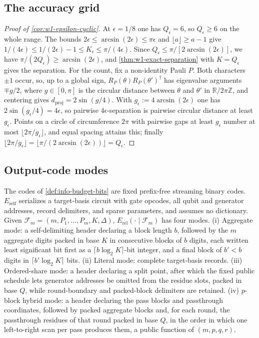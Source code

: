 \subsection{The accuracy grid}

\begin{proof}[Proof of \cref{cor:w1-epsilon-cyclic}]
At $\epsilon=1/8$ one has $Q_\epsilon=6$, so $Q_\epsilon\geq6$ on the
whole range.  The bounds $2\epsilon\leq\arcsin(2\epsilon)\leq\pi\epsilon$
and $\lfloor a\rfloor\geq a-1$ give
$1/(4\epsilon)\leq1/(2\epsilon)-1\leq K_\epsilon\leq\pi/(4\epsilon)$.
Since $Q_\epsilon\leq\pi/[2\arcsin(2\epsilon)]$, we have
$\pi/(2Q_\epsilon)\geq\arcsin(2\epsilon)$, and
\cref{thm:w1-exact-separation} with $K=Q_\epsilon$ gives the separation.
For the count, fix a non-identity Pauli $P$.  Both characters $\pm1$ occur,
so, up to a global sign, $R_P(\theta)R_P(\theta')^\dagger$ has eigenvalue
arguments $\mp g/2$, where $g\in[0,\pi]$ is the circular distance between
$\theta$ and $\theta'$ in $\mathbb R/2\pi\mathbb Z$, and centering gives $d_{\mathrm{proj}}=2\sin(g/4)$.  With
$g_\epsilon:=4\arcsin(2\epsilon)$ one has $2\sin(g_\epsilon/4)=4\epsilon$,
so pairwise $4\epsilon$-separation is pairwise circular distance at least
$g_\epsilon$.  Points on a circle of circumference $2\pi$ with pairwise
gaps at least $g_\epsilon$ number at most $\lfloor2\pi/g_\epsilon\rfloor$,
and equal spacing attains this; finally
$\lfloor2\pi/g_\epsilon\rfloor=\lfloor\pi/(2\arcsin(2\epsilon))\rfloor
=Q_\epsilon$.
\end{proof}

\subsection{Output-code modes}

The codes of \cref{def:info-budget-bits} are fixed prefix-free streaming
binary codes.  $E_{\mathrm{self}}$ serializes a target-basis circuit with
gate opcodes, all qubit and generator addresses, record delimiters, and
sparse parameters, and assumes no dictionary.  Given
$\mathcal F_m=(m,P_1,\ldots,P_m,K,\Delta)$,
$E_{\mathrm{rel}}(\cdot\mid\mathcal F_m)$ has four modes.  (i) Aggregate
mode: a self-delimiting header declaring a block length $b$, followed by
the $m$ aggregate digits packed in base $K$ in consecutive blocks of $b$
digits, each written least significant bit first as a
$\lceil b\log_2K\rceil$-bit integer, and a final block of $b'<b$ digits in
$\lceil b'\log_2K\rceil$ bits.  (ii) Literal mode: complete target-basis
records.  (iii) Ordered-share mode: a header declaring a split point,
after which the fixed public schedule lets generator addresses be omitted
from the residue slots, packed in base $Q$, while round-boundary and
packed-block delimiters are retained.  (iv) $p$-block hybrid mode: a
header declaring the pass blocks and passthrough coordinates, followed by
packed aggregate blocks and, for each round, the passthrough residues of
that round packed in base $Q$, in the order in which one left-to-right
scan per pass produces them, a public function of $(m,p,q,r)$.


